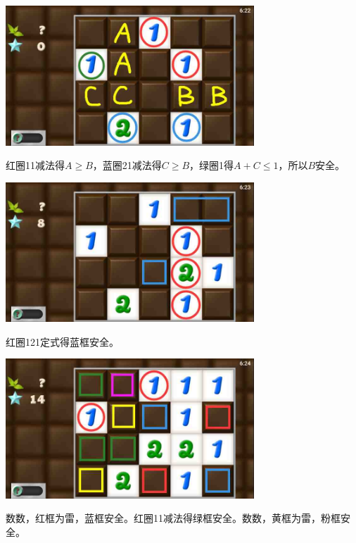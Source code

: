\subsection{} %
\begin{center}
    \includegraphics[width=0.7\textwidth]{puzzlelow/194-1.jpg}
\end{center}
红圈11减法得$A\ge B$，蓝圈21减法得$C\ge B$，绿圈1得$A+C\le 1$，所以$B$安全。
\begin{center}
    \includegraphics[width=0.7\textwidth]{puzzlelow/194-2.jpg}
\end{center}
红圈121定式得蓝框安全。
\begin{center}
    \includegraphics[width=0.7\textwidth]{puzzlelow/194-3.jpg}
\end{center}
数数，红框为雷，蓝框安全。红圈11减法得绿框安全。数数，黄框为雷，粉框安全。

